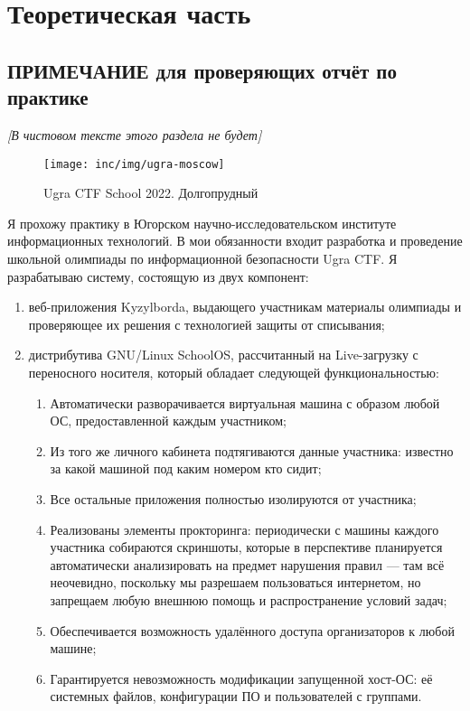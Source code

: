 \chapter{Теоретическая часть}

\section{ПРИМЕЧАНИЕ для проверяющих отчёт по практике}

\textit{[В чистовом тексте этого раздела не будет]}

\begin{figure}
  \centering
  \texttt{[image: inc/img/ugra-moscow]}
  \caption{Ugra CTF School 2022. Долгопрудный}
\end{figure}

Я прохожу практику в Югорском научно-исследовательском институте информационных технологий. В мои обязанности входит разработка и проведение школьной олимпиады по информационной безопасности Ugra CTF. Я разрабатываю систему, состоящую из двух компонент:

\begin{enumerate}
\item веб-приложения Kyzylborda, выдающего участникам материалы олимпиады и проверяющее их решения с технологией защиты от списывания;
\item дистрибутива GNU/Linux SchoolOS, рассчитанный на Live-загрузку с переносного носителя, который обладает следующей функциональностью:
  \begin{enumerate}
  \item Автоматически разворачивается виртуальная машина с образом любой ОС, предоставленной каждым участником;
  \item Из того же личного кабинета подтягиваются данные участника: известно за какой машиной под каким номером кто сидит;
  \item Все остальные приложения полностью изолируются от участника;
  \item Реализованы элементы прокторинга: периодически с машины каждого участника собираются скриншоты, которые в перспективе планируется автоматически анализировать на предмет нарушения правил — там всё неочевидно, поскольку мы разрешаем пользоваться интернетом, но запрещаем любую внешнюю помощь и распространение условий задач;
  \item Обеспечивается возможность удалённого доступа организаторов к любой машине;
  \item Гарантируется невозможность модификации запущенной хост-ОС: её системных файлов, конфигурации ПО и пользователей с группами.
  \end{enumerate}
\end{enumerate}

